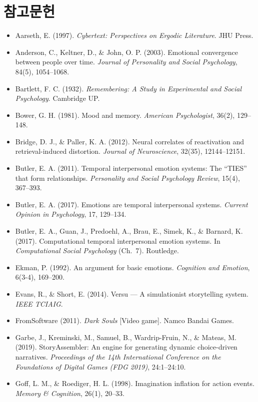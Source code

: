 \documentclass[11pt, a4paper]{article}
\begin{document}
\section*{참고문헌}
\small
\begin{itemize}
  \item Aarseth, E. (1997). \textit{Cybertext: Perspectives on Ergodic Literature}. JHU Press.
  \item Anderson, C., Keltner, D., \& John, O. P. (2003). Emotional convergence between people over time. \textit{Journal of Personality and Social Psychology}, 84(5), 1054--1068.
  \item Bartlett, F. C. (1932). \textit{Remembering: A Study in Experimental and Social Psychology}. Cambridge UP.
  \item Bower, G. H. (1981). Mood and memory. \textit{American Psychologist}, 36(2), 129--148.
  \item Bridge, D. J., \& Paller, K. A. (2012). Neural correlates of reactivation and retrieval-induced distortion. \textit{Journal of Neuroscience}, 32(35), 12144--12151.
  \item Butler, E. A. (2011). Temporal interpersonal emotion systems: The ``TIES'' that form relationships. \textit{Personality and Social Psychology Review}, 15(4), 367--393.
  \item Butler, E. A. (2017). Emotions are temporal interpersonal systems. \textit{Current Opinion in Psychology}, 17, 129--134.
  \item Butler, E. A., Guan, J., Predoehl, A., Brau, E., Simek, K., \& Barnard, K. (2017). Computational temporal interpersonal emotion systems. In \textit{Computational Social Psychology} (Ch.~7). Routledge.
  \item Ekman, P. (1992). An argument for basic emotions. \textit{Cognition and Emotion}, 6(3-4), 169--200.
  \item Evans, R., \& Short, E. (2014). Versu --- A simulationist storytelling system. \textit{IEEE TCIAIG}.
  \item FromSoftware (2011). \textit{Dark Souls} [Video game]. Namco Bandai Games.
  \item Garbe, J., Kreminski, M., Samuel, B., Wardrip-Fruin, N., \& Mateas, M. (2019). StoryAssembler: An engine for generating dynamic choice-driven narratives. \textit{Proceedings of the 14th International Conference on the Foundations of Digital Games (FDG 2019)}, 24:1--24:10.
  \item Goff, L. M., \& Roediger, H. L. (1998). Imagination inflation for action events. \textit{Memory \& Cognition}, 26(1), 20--33.

\end{itemize}
\end{document}
